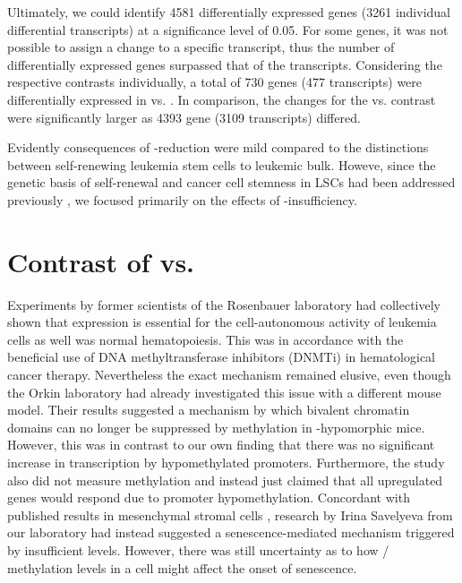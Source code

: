 Ultimately, we could identify \num{4581} differentially expressed genes (\num{3261} individual differential transcripts) at a significance level of \num{0.05}. For some genes, it was not possible to assign a change to a specific transcript, thus the number of differentially expressed genes surpassed that of the transcripts. Considering the respective contrasts individually, a total of \num{730} genes (\num{477} transcripts) were differentially expressed in \dnmtchip vs. \dnmtwt. In comparison, the changes for the \kithi vs. \kitlow contrast were significantly larger as \num{4393} gene (\num{3109} transcripts) differed.

Evidently consequences of -reduction were mild compared to the distinctions between self-renewing leukemia stem cells to leukemic bulk. Howeve, since the genetic basis of self-renewal and cancer cell stemness in LSCs had been addressed previously \cite{Chen2008,Somervaille2009,Gentles2010,Eppert2011,Cabezas-Wallscheid2013,Corces2016,Stavropoulou2016} , we focused primarily on the effects of -insufficiency. 
 
\section{Contrast of \dnmtchip vs. \dnmtwt}
\label{chap:r:degenes:genotypecontrast}

Experiments by former scientists of the Rosenbauer laboratory had collectively shown that  expression is essential for the cell-autonomous activity of \mllafnine leukemia cells as well was normal hematopoiesis\cite{Broeske2009}. This was in accordance with the beneficial use of DNA methyltransferase inhibitors (DNMTi) in hematological cancer therapy\cite{Navada2014,Jones2014}. Nevertheless the exact mechanism remained elusive, even though the Orkin laboratory had already investigated this issue with a different mouse model. Their results suggested a mechanism by which bivalent chromatin domains can no longer be suppressed by methylation in  -hypomorphic mice\cite{Trowbridge2012}. However, this was in contrast to our own finding that there was no significant increase in transcription by hypomethylated promoters. Furthermore, the study also did not measure methylation and instead just claimed that all upregulated genes would respond due to promoter hypomethylation\cite{Trowbridge2012}. Concordant with published results in mesenchymal stromal cells \cite{Lin2014}, research by Irina Savelyeva from our laboratory had instead suggested a senescence-mediated mechanism triggered by insufficient  levels. However, there was still uncertainty as to how  / methylation levels in a cell might affect the onset of senescence. 

